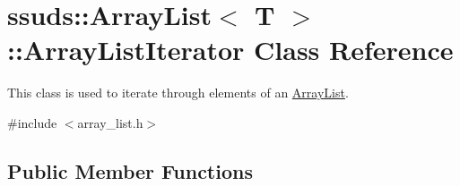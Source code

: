 \hypertarget{classssuds_1_1_array_list_1_1_array_list_iterator}{}\section{ssuds\+::Array\+List$<$ T $>$\+::Array\+List\+Iterator Class Reference}
\label{classssuds_1_1_array_list_1_1_array_list_iterator}


This class is used to iterate through elements of an \mbox{\hyperlink{classssuds_1_1_array_list}{Array\+List}}.  




{\ttfamily \#include $<$array\+\_\+list.\+h$>$}

\subsection*{Public Member Functions}
